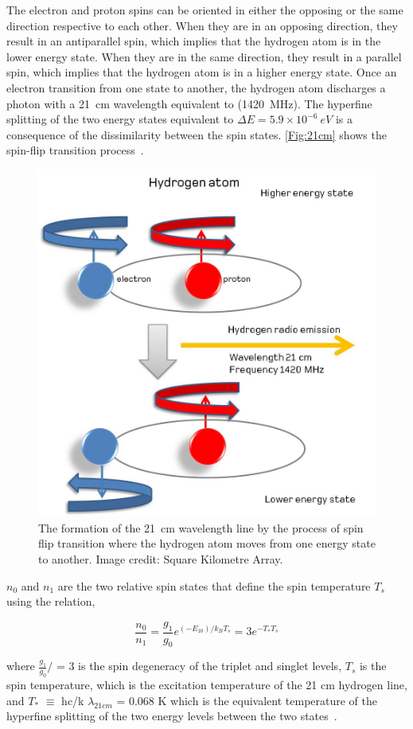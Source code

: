 	The electron and proton spins can be oriented in either the opposing or the same direction respective to each other. When they are in an opposing direction, they result in an antiparallel spin, which implies that the hydrogen atom is in the lower energy state. When they are in the same direction, they result in a parallel spin, which implies that the hydrogen atom is in a higher energy state. Once an electron transition from one state to another, the hydrogen atom discharges a photon with a \SI{21}{cm} wavelength equivalent to (\SI{1420}{MHz}). The hyperfine splitting of the two energy states equivalent to \(\Delta E =  5.9 \times 10^{-6} \ eV\) is a consequence of the dissimilarity between the spin states.
	\autoref{Fig:21cm} shows the spin-flip transition process~\citep{16, book:832129}.
	
	\begin{figure}
		\begin{center}
			\includegraphics[width=0.5\linewidth]{Figures/Hydrogenemission1.jpeg}
			\caption{The formation of the \SI{21}{cm} wavelength line by the process of spin flip transition where the hydrogen atom moves from one energy state to another. Image credit: {Square Kilometre Array}.}
			\label{Fig:21cm}
		\end{center}
	\end{figure}
	
	$n_0$ and $n_1$ are the two relative spin states that define the spin temperature $T_s$ using the relation,
	
	\begin{equation}
	\frac{n_0}{n_1} = \frac{g_1}{g_0}e^{(-E_10)/{k_B}{T_s}} = 3e^{{-T_*}{T_s}}
	\end{equation}
	
	where $\frac{g_1}{g_0}/$ = 3 is the spin degeneracy of the triplet and singlet levels, $T_s$ is the spin temperature, which is the excitation temperature of the 21 cm hydrogen line, and $T_{*}$ $\equiv$ hc/k $\lambda_{21cm}$ = 0.068 K which is the equivalent temperature of the hyperfine splitting of the two energy levels between the two states~\citep{2012RPPh...75h6901P}.
	
